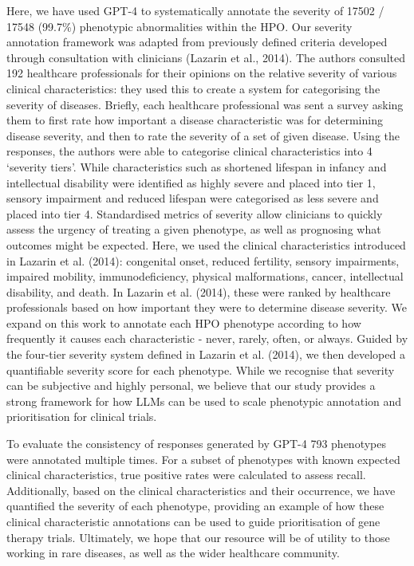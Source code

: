 \documentclass[
]{agujournal2019}
\begin{document}
Here, we have used GPT-4 to systematically annotate the severity of
17502 / 17548 (99.7\%) phenotypic abnormalities within the HPO. Our
severity annotation framework was adapted from previously defined
criteria developed through consultation with clinicians (Lazarin et al.,
2014). The authors consulted 192 healthcare professionals for their
opinions on the relative severity of various clinical characteristics:
they used this to create a system for categorising the severity of
diseases. Briefly, each healthcare professional was sent a survey asking
them to first rate how important a disease characteristic was for
determining disease severity, and then to rate the severity of a set of
given disease. Using the responses, the authors were able to categorise
clinical characteristics into 4 `severity tiers'. While characteristics
such as shortened lifespan in infancy and intellectual disability were
identified as highly severe and placed into tier 1, sensory impairment
and reduced lifespan were categorised as less severe and placed into
tier 4. Standardised metrics of severity allow clinicians to quickly
assess the urgency of treating a given phenotype, as well as prognosing
what outcomes might be expected. Here, we used the clinical
characteristics introduced in Lazarin et al. (2014): congenital onset,
reduced fertility, sensory impairments, impaired mobility,
immunodeficiency, physical malformations, cancer, intellectual
disability, and death. In Lazarin et al. (2014), these were ranked by
healthcare professionals based on how important they were to determine
disease severity. We expand on this work to annotate each HPO phenotype
according to how frequently it causes each characteristic - never,
rarely, often, or always. Guided by the four-tier severity system
defined in Lazarin et al. (2014), we then developed a quantifiable
severity score for each phenotype. While we recognise that severity can
be subjective and highly personal, we believe that our study provides a
strong framework for how LLMs can be used to scale phenotypic annotation
and prioritisation for clinical trials.

To evaluate the consistency of responses generated by GPT-4 793
phenotypes were annotated multiple times. For a subset of phenotypes
with known expected clinical characteristics, true positive rates were
calculated to assess recall. Additionally, based on the clinical
characteristics and their occurrence, we have quantified the severity of
each phenotype, providing an example of how these clinical
characteristic annotations can be used to guide prioritisation of gene
therapy trials. Ultimately, we hope that our resource will be of utility
to those working in rare diseases, as well as the wider healthcare
community.
\end{document}
